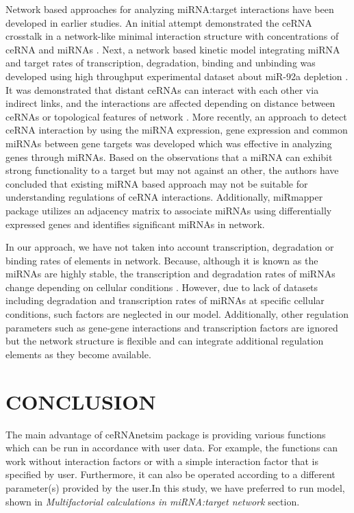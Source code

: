 \documentclass[a4,center,fleqn]{NAR}
\begin{document}
Network based approaches for analyzing miRNA:target interactions have
been developed in earlier studies. An initial attempt demonstrated the
ceRNA crosstalk in a network-like minimal interaction structure with
concentrations of ceRNA and miRNAs \citep{figliuzzi_micrornas_2013}.
Next, a network based kinetic model integrating miRNA and target rates
of transcription, degradation, binding and unbinding was developed
\citep{nitzan_interactions_2014} using high throughput experimental
dataset about miR-92a depletion \citep{helwak_mapping_2013}. It was
demonstrated that distant ceRNAs can interact with each other via
indirect links, and the interactions are affected depending on distance
between ceRNAs or topological features of network
\citep{nitzan_interactions_2014}. More recently, an approach to detect
ceRNA interaction by using the miRNA expression, gene expression and
common miRNAs between gene targets was developed
\citep{markus_list_sponge_2017} which was effective in analyzing genes
through miRNAs. Based on the observations that a miRNA can exhibit
strong functionality to a target but may not against an other, the
authors have concluded that existing miRNA based approach may not be
suitable for understanding regulations of ceRNA interactions.
Additionally, miRmapper package \citep{da2018mirmapper} utilizes an
adjacency matrix to associate miRNAs using differentially expressed
genes and identifies significant miRNAs in network.

In our approach, we have not taken into account transcription,
degradation or binding rates of elements in network. Because, although
it is known as the miRNAs are highly stable, the transcription and
degradation rates of miRNAs change depending on cellular conditions
\citep{ruegger_microrna_2012}. However, due to lack of datasets
including degradation and transcription rates of miRNAs at specific
cellular conditions, such factors are neglected in our model.
Additionally, other regulation parameters such as gene-gene interactions
and transcription factors are ignored but the network structure is
flexible and can integrate additional regulation elements as they become
available.

\section{CONCLUSION}

The main advantage of ceRNAnetsim package is providing various functions
which can be run in accordance with user data. For example, the
functions can work without interaction factors or with a simple
interaction factor that is specified by user. Furthermore, it can also
be operated according to a different parameter(s) provided by the
user.In this study, we have preferred to run model, shown in
\emph{Multifactorial calculations in miRNA:target network} section.
\end{document}
